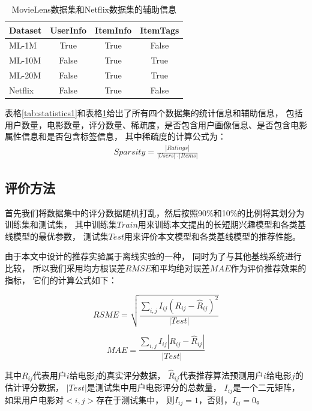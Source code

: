 \begin{table}[htbp]
    \centering
    \caption{MovieLens数据集和Netflix数据集的辅助信息}
    \label{tab:statistics2}
        \begin{tabular}{|l|c|c|c|}
        \hline
        \textbf{Dataset} & \textbf{UserInfo} & \textbf{ItemInfo} & \textbf{ItemTags} \\
        \hline
        ML-1M   & True  & True & False \\
        ML-10M  & False & True & True  \\
        ML-20M  & False & True & True  \\
        Netflix & False & True & False \\
        \hline
    \end{tabular}
\end{table}

表格\ref{tab:statistics1}和表格\ref{tab:statistics2}给出了所有四个数据集的统计信息和辅助信息，
包括用户数量，电影数量，评分数量、稀疏度，是否包含用户画像信息、是否包含电影属性信息和是否包含标签信息，
其中稀疏度的计算公式为：
\begin{equation}
\begin{split}
Sparsity = \frac{|Ratings|}{|Users| \cdot |Items|}
\end{split}
\end{equation}

\subsection{评价方法}
首先我们将数据集中的评分数据随机打乱，然后按照90\%和10\%的比例将其划分为训练集和测试集，
其中训练集$Train$用来训练本文提出的长短期兴趣模型和各类基线模型的最优参数，
测试集$Test$用来评价本文模型和各类基线模型的推荐性能。

由于本文中设计的推荐实验属于离线实验的一种，
同时为了与其他基线系统进行比较，
所以我们采用均方根误差$RMSE$和平均绝对误差$MAE$作为评价推荐效果的指标，
它们的计算公式如下：

\begin{equation}
RSME = \sqrt{ \frac{\sum_{i,j} I_{ij} (R_{ij} - \hat{R}_{ij})^2 } {|Test|} }
\end{equation}

\begin{equation}
MAE = \frac{\sum_{i,j} I_{ij} |R_{ij} - \hat{R}_{ij}|}{|Test|}
\end{equation}

其中$R_{ij}$代表用户$i$给电影$j$的真实评分数据，
$\hat{R}_{ij}$代表推荐算法预测用户$i$给电影$j$的估计评分数据，
$|Test|$是测试集中用户电影评分的总数量，
$I_{ij}$是一个二元矩阵，如果用户电影对$<i, j>$存在于测试集中，
则$I_{ij} = 1$，否则，$I_{ij} = 0$。


